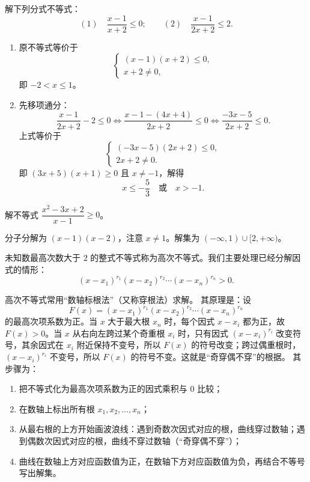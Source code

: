 \begin{example}
  解下列分式不等式：
  \[
  (1)\quad \frac{x-1}{x+2}\le 0;\qquad
  (2)\quad \frac{x-1}{2x+2}\le 2.
  \]
\end{example}
\begin{jie}
  \begin{enumerate}
    \item 原不等式等价于
    \[
    \begin{cases}
      (x-1)(x+2)\le 0,\\
      x+2\ne 0,
    \end{cases}
    \]
    即 \(-2<x\le 1\)。
    \item 先移项通分：
    \[
    \frac{x-1}{2x+2}-2\le 0
    \iff \frac{x-1-(4x+4)}{2x+2}\le 0
    \iff \frac{-3x-5}{2x+2}\le 0.
    \]
    上式等价于
    \[
    \begin{cases}
      (-3x-5)(2x+2)\le 0,\\
      2x+2\ne 0.
    \end{cases}
    \]
    即 \((3x+5)(x+1)\ge 0\) 且 \(x\ne -1\)，解得
    \[
    x\le -\frac53\quad\text{或}\quad x>-1.
    \]
  \end{enumerate}
\end{jie}

\begin{exercise}
  解不等式 \(\dfrac{x^2-3x+2}{x-1}\ge 0\)。
\end{exercise}
\begin{hint}
  分子分解为 \((x-1)(x-2)\)，注意 \(x\ne 1\)。解集为 \((-\infty,1)\cup[2,+\infty)\)。
\end{hint}

\begin{definition}[高次不等式]
  未知数最高次数大于 \(2\) 的整式不等式称为高次不等式。我们主要处理已经分解因式的情形：
  \[
  (x-x_1)^{r_1}(x-x_2)^{r_2}\cdots(x-x_n)^{r_n}>0.
  \]
\end{definition}
高次不等式常用“数轴标根法”（又称穿根法）求解。
其原理是：设
\[
F(x)=(x-x_1)^{r_1}(x-x_2)^{r_2}\cdots(x-x_n)^{r_n}
\]
的最高次项系数为正。当 \(x\) 大于最大根 \(x_n\) 时，每个因式 \(x-x_i\) 都为正，故 \(F(x)>0\)。当 \(x\) 从右向左跨过某个奇重根 \(x_i\) 时，只有因式 \((x-x_i)^{r_i}\) 改变符号，其余因式在 \(x_i\) 附近保持不变号，所以 \(F(x)\) 的符号改变；跨过偶重根时，\((x-x_i)^{r_i}\) 不变号，所以 \(F(x)\) 的符号不变。这就是“奇穿偶不穿”的根据。
其步骤为：
\begin{enumerate}
  \item 把不等式化为最高次项系数为正的因式乘积与 \(0\) 比较；
  \item 在数轴上标出所有根 \(x_1,x_2,\dots,x_n\)；
  \item 从最右根的上方开始画波浪线：遇到奇数次因式对应的根，曲线穿过数轴；遇到偶数次因式对应的根，曲线不穿过数轴（“奇穿偶不穿”）；
  \item 曲线在数轴上方对应函数值为正，在数轴下方对应函数值为负，再结合不等号写出解集。
\end{enumerate}

